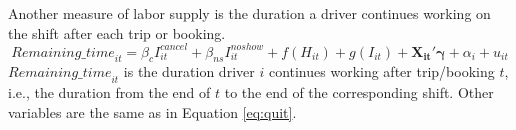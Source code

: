 \documentclass[reviewmode]{restat}
\begin{document}
Another measure of labor supply is the duration a driver continues working on the shift after each trip or booking. 
\begin{equation}
\label{eq:rmins}
{Remaining\_time}_{it} = \beta_c I^{cancel}_{it} + \beta_{ns} I^{noshow}_{it} + f(H_{it}) + g(I_{it}) + \mathbf{X_{it}}'\mathbf{\gamma} + \alpha_i + u_{it}
\end{equation}
${Remaining\_time}_{it}$ is the duration driver $i$ continues working after trip/booking $t$, i.e., the 
duration from the end of $t$ %
to the end of the corresponding shift. %
Other variables are %
the same as in Equation \eqref{eq:quit}.


\end{document}
